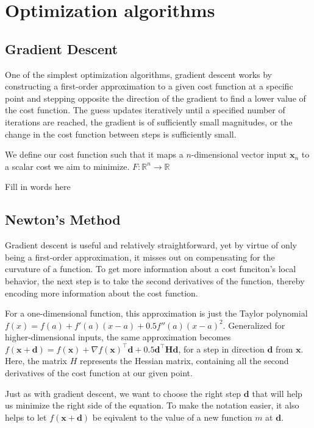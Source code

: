 \documentclass[12pt]{article}
\begin{document}
\section{Optimization algorithms}

\subsection{Gradient Descent}
One of the simplest optimization algorithms, gradient descent works by constructing a first-order
approximation to a given cost function at a specific point and stepping opposite the direction of the 
gradient to find a lower value of the cost function. The guess updates iteratively until a specified number of
iterations are reached, the gradient is of sufficiently small magnitudes, or the change in the cost function
between steps is sufficiently small. 

We define our cost function such that it maps a \(n\)-dimensional vector input \(\mathbf{x}_n\)
to a scalar cost we aim to minimize. \(F : \mathbb{R}^n \to \mathbb{R}\)

Fill in words here

\subsection{Newton's Method}
Gradient descent is useful and relatively straightforward, yet by virtue of only being a first-order approximation,
it misses out on compensating for the curvature of a function. To get more information about a cost funciton's local
behavior, the next step is to take the second derivatives of the function, thereby encoding more information about the
cost function. 

For a one-dimensional function, this approximation is just the Taylor polynomial 
\(f(x) = f(a) + f'(a)(x-a) + 0.5 f''(a)(x-a)^2\). Generalized for higher-dimensional inputs, the same approximation
becomes \(f(\mathbf{x}+\mathbf{d}) = f(\mathbf{x}) + \nabla f(\mathbf{x})^\top \mathbf{d} + 0.5\mathbf{d}^\top \mathbf{H} \mathbf{d}\),
for a step in direction \(\mathbf{d}\) from \(\mathbf{x}\). Here, the matrix \(H\) represents the Hessian matrix,
containing all the second derivatives of the cost function at our given point. 

Just as with gradient descent, we want to choose the right step \(\mathbf{d}\) that will help us
minimize the right side of the equation. To make the notation easier, it also helps to let \(f(\mathbf{x}+\mathbf{d})\)
be eqivalent to the value of a new function \(m\) at \(\mathbf{d}\).
\end{document}
